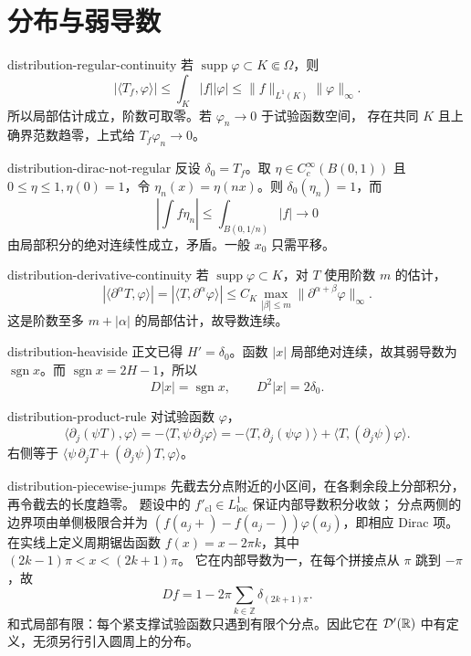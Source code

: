 \chapter{分布与弱导数}

\begin{solution}{distribution-regular-continuity}
若 \(\operatorname{supp}\varphi\subset K\Subset\Omega\)，则
\[
 |\langle T_f,\varphi\rangle|
 \le\int_K|f||\varphi|
 \le\|f\|_{L^1(K)}\|\varphi\|_\infty.
\]
所以局部估计成立，阶数可取零。若 \(\varphi_n\to0\) 于试验函数空间，
存在共同 \(K\) 且上确界范数趋零，上式给 \(T_f\varphi_n\to0\)。
\end{solution}

\begin{solution}{distribution-dirac-not-regular}
反设 \(\delta_0=T_f\)。取 \(\eta\in C_c^\infty(B(0,1))\) 且
\(0\le\eta\le1,\eta(0)=1\)，令 \(\eta_n(x)=\eta(nx)\)。则
\(\delta_0(\eta_n)=1\)，而
\[
 \left|\int f\eta_n\right|
 \le\int_{B(0,1/n)}|f|\to0
\]
由局部积分的绝对连续性成立，矛盾。一般 \(x_0\) 只需平移。
\end{solution}

\begin{solution}{distribution-derivative-continuity}
若 \(\operatorname{supp}\varphi\subset K\)，对 \(T\) 使用阶数 \(m\) 的估计，
\[
 |\langle\partial^\alpha T,\varphi\rangle|
 =|\langle T,\partial^\alpha\varphi\rangle|
 \le C_K\max_{|\beta|\le m}
 \|\partial^{\alpha+\beta}\varphi\|_\infty.
\]
这是阶数至多 \(m+|\alpha|\) 的局部估计，故导数连续。
\end{solution}

\begin{solution}{distribution-heaviside}
正文已得 \(H'=\delta_0\)。函数 \(|x|\) 局部绝对连续，故其弱导数为
\(\operatorname{sgn}x\)。而
\(\operatorname{sgn}x=2H-1\)，所以
\[
 D|x|=\operatorname{sgn}x,\qquad D^2|x|=2\delta_0.
\]
\end{solution}

\begin{solution}{distribution-product-rule}
对试验函数 \(\varphi\)，
\[
 \langle\partial_j(\psi T),\varphi\rangle
 =-\langle T,\psi\,\partial_j\varphi\rangle
 =-\langle T,\partial_j(\psi\varphi)\rangle
   +\langle T,(\partial_j\psi)\varphi\rangle.
\]
右侧等于
\(\langle\psi\,\partial_jT+(\partial_j\psi)T,\varphi\rangle\)。
\end{solution}

\begin{solution}{distribution-piecewise-jumps}
先截去分点附近的小区间，在各剩余段上分部积分，再令截去的长度趋零。
题设中的 \(f'_{\mathrm{cl}}\in L^1_{\mathrm{loc}}\) 保证内部导数积分收敛；
分点两侧的边界项由单侧极限合并为
\((f(a_j+)-f(a_j-))\varphi(a_j)\)，即相应 Dirac 项。
在实线上定义周期锯齿函数
\(f(x)=x-2\pi k\)，其中 \((2k-1)\pi<x<(2k+1)\pi\)。
它在内部导数为一，在每个拼接点从 \(\pi\) 跳到 \(-\pi\)，故
\[
 Df=1-2\pi\sum_{k\in\mathbb Z}\delta_{(2k+1)\pi}.
\]
和式局部有限：每个紧支撑试验函数只遇到有限个分点。因此它在
\(\mathcal D'(\mathbb{R})\) 中有定义，无须另行引入圆周上的分布。
\end{solution}

